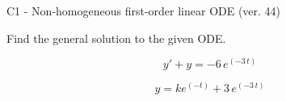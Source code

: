 \begin{exercise}
  \begin{exerciseTitle}C1 - Non-homogeneous first-order linear ODE (ver. 44)\end{exerciseTitle}
  \begin{exerciseStatement}
    
Find the general solution to the given ODE.

    
\[y'+y= -6 \, e^{\left(-3 \, t\right)}\]

  \end{exerciseStatement}
  \begin{exerciseAnswer}
    
\[y= k e^{\left(-t\right)} + 3 \, e^{\left(-3 \, t\right)}\]

  \end{exerciseAnswer}
\end{exercise}